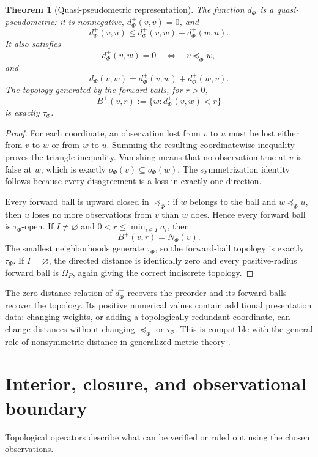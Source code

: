 \documentclass[11pt]{article}
\theoremstyle{definition}
\theoremstyle{plain}
\newtheorem{theorem}[definition]{Theorem}
\theoremstyle{remark}
\begin{document}
\begin{theorem}[Quasi-pseudometric representation]
The function $d_\Phi^+$ is a quasi-pseudometric: it is nonnegative,
$d_\Phi^+(v,v)=0$, and
\[
 d_\Phi^+(v,u)\leq d_\Phi^+(v,w)+d_\Phi^+(w,u).
\]
It also satisfies
\[
 d_\Phi^+(v,w)=0
 \quad\Longleftrightarrow\quad
 v\preceq_\Phi w,
\]
and
\[
 d_\Phi(v,w)=d_\Phi^+(v,w)+d_\Phi^+(w,v).
\]
The topology generated by the forward balls, for $r>0$,
\[
 B^+(v,r):=\{w:d_\Phi^+(v,w)<r\}
\]
is exactly $\tau_\Phi$.
\end{theorem}

\begin{proof}
For each coordinate, an observation lost from $v$ to $u$ must be lost either
from $v$ to $w$ or from $w$ to $u$.  Summing the resulting coordinatewise
inequality proves the triangle inequality.  Vanishing means that no observation
true at $v$ is false at $w$, which is exactly
$o_\Phi(v)\subseteq o_\Phi(w)$.  The symmetrization identity follows because every
disagreement is a loss in exactly one direction.

Every forward ball is upward closed in $\preceq_\Phi$: if $w$ belongs to the ball
and $w\preceq_\Phi u$, then $u$ loses no more observations from $v$ than $w$
does.  Hence every forward ball is $\tau_\Phi$-open.  If $I\neq\varnothing$ and
$0<r\leq\min_{i\in I} a_i$, then
\[
 B^+(v,r)=N_\Phi(v).
\]
The smallest neighborhoods generate $\tau_\Phi$, so the forward-ball topology is
exactly $\tau_\Phi$.  If $I=\varnothing$, the directed distance is identically zero and
every positive-radius forward ball is $\Omega_P$, again giving the correct
indiscrete topology.
\end{proof}

The zero-distance relation of $d_\Phi^+$ recovers the preorder and its forward
balls recover the topology.  Its positive numerical values contain additional
presentation data: changing weights, or adding a topologically redundant
coordinate, can change distances without changing $\preceq_\Phi$ or
$\tau_\Phi$.  This is compatible with the general role of nonsymmetric distance
in generalized metric theory \cite{Lawvere1973}.

\section{Interior, closure, and observational boundary}

Topological operators describe what can be verified or ruled out using the
chosen observations.
\end{document}
